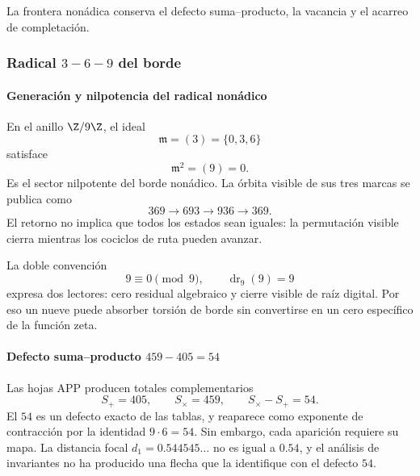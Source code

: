 \noindent La frontera nonádica conserva el defecto suma--producto, la vacancia y el acarreo de completación.\par\medskip

\subsubsection{Radical \(3\! -\! 6\! -\! 9\) del borde}

\paragraph{Generación y nilpotencia del radical nonádico}

En el anillo \(\Z/9\Z\), el ideal
\begin{equation}
\mathfrak m=(3)=\{0,3,6\}
\label{eq:radical-369}
\end{equation}
satisface
\begin{equation}
\mathfrak m^2=(9)=0.
\label{eq:m-square-zero}
\end{equation}
Es el sector nilpotente del borde nonádico. La órbita visible de sus tres
marcas se publica como
\[
369\longrightarrow693\longrightarrow936\longrightarrow369.
\]
El retorno no implica que todos los estados sean iguales: la permutación
visible cierra mientras los cociclos de ruta pueden avanzar.

La doble convención
\[
9\equiv0\pmod9,
\qquad
\operatorname{dr}_9(9)=9
\]
expresa dos lectores: cero residual algebraico y cierre visible de raíz
digital. Por eso un nueve puede absorber torsión de borde sin convertirse en
un cero específico de la función zeta.

\paragraph{Defecto suma--producto \(459-405=54\)}

Las hojas APP producen totales complementarios
\[
S_+=405,\qquad S_\times=459,\qquad S_\times-S_+=54.
\]
El \(54\) es un defecto exacto de las tablas, y reaparece como exponente de
contracción por la identidad \(9\cdot6=54\). Sin embargo, cada aparición
requiere su mapa. La distancia focal \(d_1=0.544545\ldots\) no es igual a
\(0.54\), y el análisis de invariantes no ha producido una flecha que la
identifique con el defecto \(54\).

